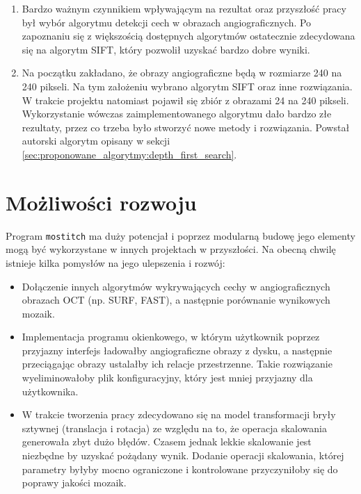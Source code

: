 \begin{enumerate}
\item Bardzo ważnym czynnikiem wpływającym na rezultat oraz przyszłość pracy był wybór algorytmu detekcji cech w obrazach angiograficznych. Po zapoznaniu się z większością dostępnych algorytmów ostatecznie zdecydowana się na algorytm SIFT, który pozwolił uzyskać bardzo dobre wyniki.
\item Na początku zakładano, że obrazy angiograficzne będą w rozmiarze 240 na 240 pikseli. Na tym założeniu wybrano algorytm SIFT oraz inne rozwiązania. W trakcie projektu natomiast pojawił się zbiór z obrazami 24 na 240 pikseli. Wykorzystanie wówczas zaimplementowanego algorytmu dało bardzo złe rezultaty, przez co trzeba było stworzyć nowe metody i rozwiązania. Powstał autorski algorytm opisany w sekcji \ref{sec:proponowane_algorytmy:depth_first_search}.
\end{enumerate}

\section{Możliwości rozwoju}
\label{sec:podsumowanie_i_wnioski:mozliwosci_rozwoju}

Program \texttt{mostitch} ma duży potencjał i poprzez modularną budowę jego elementy mogą być wykorzystane w innych projektach w przyszłości. Na obecną chwilę istnieje kilka pomysłów na jego ulepszenia i rozwój:

\begin{itemize}
\item Dołączenie innych algorytmów wykrywających cechy w angiograficznych obrazach OCT (np. SURF, FAST), a następnie porównanie wynikowych mozaik.
\item Implementacja programu okienkowego, w którym użytkownik poprzez przyjazny interfejs ładowałby angiograficzne obrazy z dysku, a następnie przeciągając obrazy ustalałby ich relacje przestrzenne. Takie rozwiązanie wyeliminowałoby plik konfiguracyjny, który jest mniej przyjazny dla użytkownika.
\item W trakcie tworzenia pracy zdecydowano się na model transformacji bryły sztywnej (translacja i rotacja) ze względu na to, że operacja skalowania generowała zbyt dużo błędów. Czasem jednak lekkie skalowanie jest niezbędne by uzyskać pożądany wynik. Dodanie operacji skalowania, której parametry byłyby mocno ograniczone i kontrolowane przyczyniłoby się do poprawy jakości mozaik.
\end{itemize}


